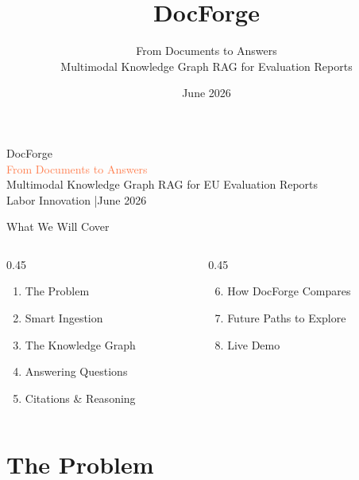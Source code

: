 \documentclass[aspectratio=169,11pt]{beamer}
\title{DocForge}
\subtitle{From Documents to Answers\\[4pt]
  \small Multimodal Knowledge Graph RAG for Evaluation Reports}
\author{}
\date{June 2026}
\institute{\textcolor{midgray}{Labor Innovation}}
\begin{document}

\begin{frame}[plain]
  \begin{center}
    \vspace{1.5cm}
    {\textcolor{terracotta}{DocForge}}\\[6pt]
    {\large\textcolor{coral}{From Documents to Answers}}\\[4pt]
    {\small\textcolor{midgray}{Multimodal Knowledge Graph RAG
      for EU Evaluation Reports}}\\[1.4cm]
    {\footnotesize\textcolor{midgray}{Labor Innovation \quad|\quad June 2026}}
  \end{center}
\end{frame}

\begin{frame}{What We Will Cover}
  \vspace{0.3cm}
  \begin{columns}[t]
    \begin{column}{0.45\textwidth}
      \begin{enumerate}\setlength\itemsep{8pt}
        \item The Problem
        \item Smart Ingestion
        \item The Knowledge Graph
        \item Answering Questions
        \item Citations \& Reasoning
      \end{enumerate}
    \end{column}
    \begin{column}{0.45\textwidth}
      \begin{enumerate}\setcounter{enumi}{5}\setlength\itemsep{8pt}
        \item How DocForge Compares
        \item Future Paths to Explore
        \item Live Demo
      \end{enumerate}
    \end{column}
  \end{columns}
\end{frame}

\section{The Problem}
\end{document}
